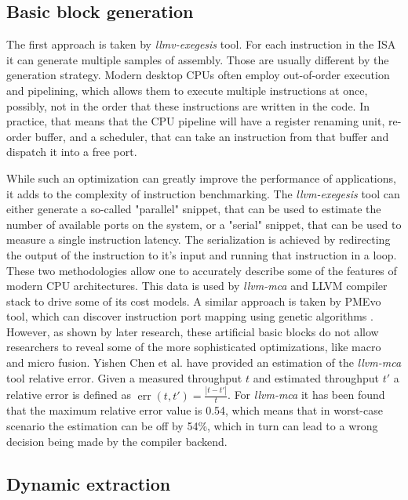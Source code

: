 \subsection{Basic block generation}

The first approach is taken by \textit{llmv-exegesis} tool. For each instruction in the ISA it can 
generate multiple samples of assembly. Those are usually different by the generation strategy. 
Modern desktop CPUs often employ out-of-order execution and pipelining, which allows them to execute 
multiple instructions at once, possibly, not in the order that these instructions are written in the 
code. In practice, that means that the CPU pipeline will have a register renaming unit, re-order buffer, 
and a scheduler, that can take an instruction from that buffer and dispatch it into a free port.

While such an optimization can greatly improve the performance of applications, it adds to the complexity 
of instruction benchmarking. The \textit{llvm-exegesis} tool can either generate a so-called "parallel" snippet, 
that can be used to estimate the number of available ports on the system, or a "serial" snippet, 
that can be used to measure a single instruction latency. The serialization is achieved by redirecting 
the output of the instruction to it's input and running that instruction in a loop. These two 
methodologies allow one to accurately describe some of the features of modern CPU architectures. 
This data is used by \textit{llvm-mca} and LLVM compiler stack to drive some of its cost models. 
A similar approach is taken by PMEvo tool, which can discover instruction port mapping using genetic 
algorithms \cite{ritterPMEvoPortableInference2020}. However, as shown by later research, these artificial 
basic blocks do not allow researchers to reveal some of the more sophisticated optimizations, like macro 
and micro fusion. Yishen Chen et al. \cite{chenBHiveBenchmarkSuite2019} have provided an estimation of 
the \textit{llvm-mca} tool relative error. Given a measured throughput $t$ and estimated throughput $t'$ a 
relative error is defined as $\operatorname{err}(t, t') = \frac{|t - t'|}{t}$. For \textit{llvm-mca} it has been found 
that the maximum relative error value is 0.54, which means that in worst-case scenario the estimation can
be off by 54\%, which in turn can lead to a wrong decision being made by the compiler backend.

\subsection{Dynamic extraction}

